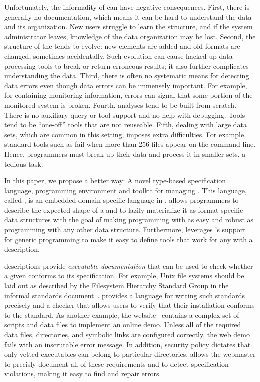 Unfortunately, the informality of \filestores{} can have
negative consequences.  First, there is generally no documentation,
which means it can be hard to understand the data and its
organization.  New users struggle to learn the structure, and if
the system administrator leaves, knowledge of the data
organization may be lost.  Second, the structure of the \filestore{} tends
to evolve: new elements are added and old formats are changed, sometimes
accidentally.  Such evolution can cause hacked-up data processing
tools to break or return erroneous results; it also further complicates
understanding the data.  Third, there is often no
systematic means for detecting data errors even though data errors can
be immensely
important.  For example, for \filestores{} containing monitoring information,
errors can signal that some portion of the monitored system is broken.
Fourth, analyses tend to be built from scratch.
There is no auxiliary query or tool support and no help with debugging.
Tools tend to be ``one-off'' tools that are not
reuseable.  Fifth, dealing with
large data sets, which are common in this setting, imposes extra
difficulties.  For example,  standard tools
such as  fail when more than 256 files appear on the
command line.  Hence, programmers must  break up their data
and process it in smaller sets, a tedious task.

In this paper, we propose a better way: A novel type-based
specification language, programming environment and toolkit for
managing \filestores{}.  
This language, called \forest{}, is an embedded domain-specific
language in \haskell{}.
\forest{} allows programmers to describe the expected shape of a
\filestore{} and to lazily materialize it as
format-specific \haskell{} data structures with the
goal of making programming with \filestores{} as
easy and robust as programming with any other \haskell{} data
structure.
Furthermore, \forest{} leverages
\haskell{}'s support for generic programming to make it easy to define
tools that work for any \filestore{} with a \forest{} description.  


\forest{} descriptions provide {\em executable
  documentation} that can be used to check whether a given
\filestore{} conforms to its specification.  For example, Unix file
systems should be laid out as described by the Filesystem Hierarchy
Standard Group in the informal standards document~\cite{fsh}.  \forest{}
provides a language for writing such standards precisely and a checker
that allows users to verify that their installation conforms to the
standard.  As another example, the \pads{} website~\cite{padsweb}
contains a complex set of scripts and data files to
implement an online demo.  Unless all of the required data files,
directories, and symbolic links are configured correctly, the web demo 
fails with an inscrutable error message.  In addition, security policy
dictates that only vetted executables can belong to particular
directories. \forest{} allows the \pads{} webmaster to precisly
document all of these requirements and to detect specification
violations, making it easy to find and repair errors.

